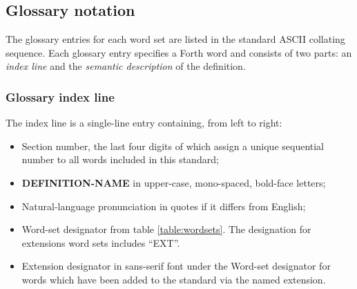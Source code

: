 \subsection{Glossary notation}
\label{notation:glossary}

The glossary entries for each word set are listed in the standard
ASCII collating sequence. Each glossary entry specifies a Forth
word and consists of two parts:
an \emph{index line} and the \emph{semantic description} of the
definition.

\subsubsection{Glossary index line}

The index line is a single-line entry containing, from left to right:

\begin{itemize}
\item Section number, the last four digits of which assign a
	unique sequential number to all words included in this standard;

\item \textbf{DEFINITION-NAME} in upper-case, mono-spaced,
	bold-face letters;

\item Natural-language pronunciation in quotes if it differs from English;

\item Word-set designator from table \ref{table:wordsets}.
	The designation for extensions word sets includes ``EXT''.

\item \textsf{Extension designator} in sans-serif font under the
	Word-set designator for words which have been added to the
	standard via the named extension.
\end{itemize}


